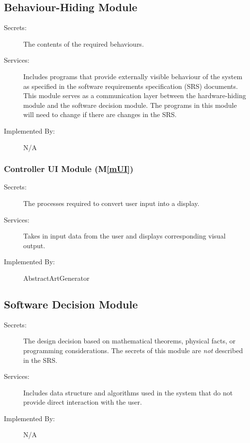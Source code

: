 \documentclass[12pt, titlepage]{article}
\newcommand{\mref}[1]{M\ref{#1}}
\begin{document}
\subsection{Behaviour-Hiding Module}

\begin{description}
\item[Secrets:]The contents of the required behaviours.
\item[Services:]Includes programs that provide externally visible behaviour of
  the system as specified in the software requirements specification (SRS)
  documents. This module serves as a communication layer between the
  hardware-hiding module and the software decision module. The programs in this
  module will need to change if there are changes in the SRS.
\item[Implemented By:] N/A
\end{description}

\subsubsection{Controller UI Module (\mref{mUI})}

\begin{description}
\item[Secrets:] The processes required to convert user input into a display.
\item[Services:] Takes in input data from the user and displays corresponding visual output.
\item[Implemented By:] AbstractArtGenerator
\end{description}


\subsection{Software Decision Module}

\begin{description}
\item[Secrets:] The design decision based on mathematical theorems, physical
  facts, or programming considerations. The secrets of this module are
  \emph{not} described in the SRS.
\item[Services:] Includes data structure and algorithms used in the system that
  do not provide direct interaction with the user. 
\item[Implemented By:] N/A
\end{description}
\end{document}
